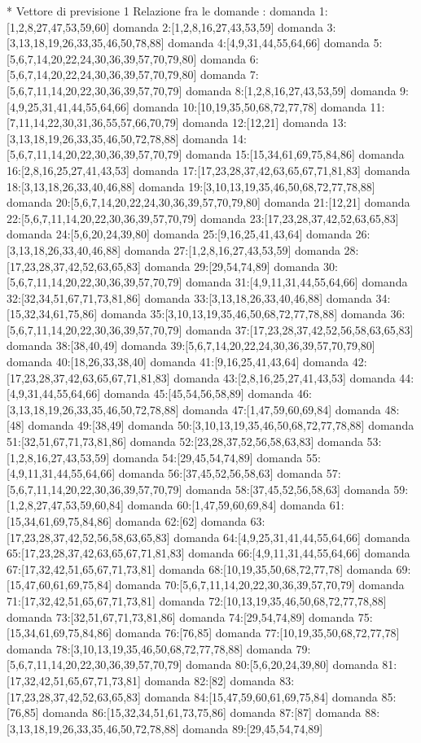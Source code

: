 * Vettore di previsione 1
Relazione fra le domande :
domanda 1:[1,2,8,27,47,53,59,60]
domanda 2:[1,2,8,16,27,43,53,59]
domanda 3:[3,13,18,19,26,33,35,46,50,78,88]
domanda 4:[4,9,31,44,55,64,66]
domanda 5:[5,6,7,14,20,22,24,30,36,39,57,70,79,80]
domanda 6:[5,6,7,14,20,22,24,30,36,39,57,70,79,80]
domanda 7:[5,6,7,11,14,20,22,30,36,39,57,70,79]
domanda 8:[1,2,8,16,27,43,53,59]
domanda 9:[4,9,25,31,41,44,55,64,66]
domanda 10:[10,19,35,50,68,72,77,78]
domanda 11:[7,11,14,22,30,31,36,55,57,66,70,79]
domanda 12:[12,21]
domanda 13:[3,13,18,19,26,33,35,46,50,72,78,88]
domanda 14:[5,6,7,11,14,20,22,30,36,39,57,70,79]
domanda 15:[15,34,61,69,75,84,86]
domanda 16:[2,8,16,25,27,41,43,53]
domanda 17:[17,23,28,37,42,63,65,67,71,81,83]
domanda 18:[3,13,18,26,33,40,46,88]
domanda 19:[3,10,13,19,35,46,50,68,72,77,78,88]
domanda 20:[5,6,7,14,20,22,24,30,36,39,57,70,79,80]
domanda 21:[12,21]
domanda 22:[5,6,7,11,14,20,22,30,36,39,57,70,79]
domanda 23:[17,23,28,37,42,52,63,65,83]
domanda 24:[5,6,20,24,39,80]
domanda 25:[9,16,25,41,43,64]
domanda 26:[3,13,18,26,33,40,46,88]
domanda 27:[1,2,8,16,27,43,53,59]
domanda 28:[17,23,28,37,42,52,63,65,83]
domanda 29:[29,54,74,89]
domanda 30:[5,6,7,11,14,20,22,30,36,39,57,70,79]
domanda 31:[4,9,11,31,44,55,64,66]
domanda 32:[32,34,51,67,71,73,81,86]
domanda 33:[3,13,18,26,33,40,46,88]
domanda 34:[15,32,34,61,75,86]
domanda 35:[3,10,13,19,35,46,50,68,72,77,78,88]
domanda 36:[5,6,7,11,14,20,22,30,36,39,57,70,79]
domanda 37:[17,23,28,37,42,52,56,58,63,65,83]
domanda 38:[38,40,49]
domanda 39:[5,6,7,14,20,22,24,30,36,39,57,70,79,80]
domanda 40:[18,26,33,38,40]
domanda 41:[9,16,25,41,43,64]
domanda 42:[17,23,28,37,42,63,65,67,71,81,83]
domanda 43:[2,8,16,25,27,41,43,53]
domanda 44:[4,9,31,44,55,64,66]
domanda 45:[45,54,56,58,89]
domanda 46:[3,13,18,19,26,33,35,46,50,72,78,88]
domanda 47:[1,47,59,60,69,84]
domanda 48:[48]
domanda 49:[38,49]
domanda 50:[3,10,13,19,35,46,50,68,72,77,78,88]
domanda 51:[32,51,67,71,73,81,86]
domanda 52:[23,28,37,52,56,58,63,83]
domanda 53:[1,2,8,16,27,43,53,59]
domanda 54:[29,45,54,74,89]
domanda 55:[4,9,11,31,44,55,64,66]
domanda 56:[37,45,52,56,58,63]
domanda 57:[5,6,7,11,14,20,22,30,36,39,57,70,79]
domanda 58:[37,45,52,56,58,63]
domanda 59:[1,2,8,27,47,53,59,60,84]
domanda 60:[1,47,59,60,69,84]
domanda 61:[15,34,61,69,75,84,86]
domanda 62:[62]
domanda 63:[17,23,28,37,42,52,56,58,63,65,83]
domanda 64:[4,9,25,31,41,44,55,64,66]
domanda 65:[17,23,28,37,42,63,65,67,71,81,83]
domanda 66:[4,9,11,31,44,55,64,66]
domanda 67:[17,32,42,51,65,67,71,73,81]
domanda 68:[10,19,35,50,68,72,77,78]
domanda 69:[15,47,60,61,69,75,84]
domanda 70:[5,6,7,11,14,20,22,30,36,39,57,70,79]
domanda 71:[17,32,42,51,65,67,71,73,81]
domanda 72:[10,13,19,35,46,50,68,72,77,78,88]
domanda 73:[32,51,67,71,73,81,86]
domanda 74:[29,54,74,89]
domanda 75:[15,34,61,69,75,84,86]
domanda 76:[76,85]
domanda 77:[10,19,35,50,68,72,77,78]
domanda 78:[3,10,13,19,35,46,50,68,72,77,78,88]
domanda 79:[5,6,7,11,14,20,22,30,36,39,57,70,79]
domanda 80:[5,6,20,24,39,80]
domanda 81:[17,32,42,51,65,67,71,73,81]
domanda 82:[82]
domanda 83:[17,23,28,37,42,52,63,65,83]
domanda 84:[15,47,59,60,61,69,75,84]
domanda 85:[76,85]
domanda 86:[15,32,34,51,61,73,75,86]
domanda 87:[87]
domanda 88:[3,13,18,19,26,33,35,46,50,72,78,88]
domanda 89:[29,45,54,74,89]



